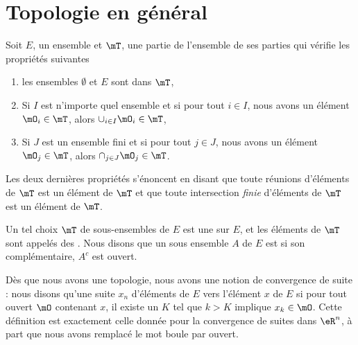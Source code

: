 
					\section{Topologie en général}

\begin{definition}		\label{DefTopologieGene}
Soit $E$, un ensemble et $\mT$, une partie de l'ensemble de ses parties qui vérifie les propriétés suivantes
\begin{enumerate}

\item
les ensembles $\emptyset$ et $E$ sont dans $\mT$,

\item
Si $I$ est n'importe quel ensemble et si pour tout $i\in I$, nous avons un élément $\mO_i\in\mT$, alors $\cup_{i\in I}\mO_i\in\mT$,

\item
Si $J$ est un ensemble fini et si pour tout $j\in J$, nous avons un élément $\mO_j\in\mT$, alors $\cap_{j\in J}\mO_j\in\mT$.

\end{enumerate}
Les deux dernières propriétés s'énoncent en disant que toute réunions d'éléments de $\mT$ est un élément de $\mT$ et que toute intersection \emph{finie} d'éléments de $\mT$ est un élément de $\mT$.

Un tel choix $\mT$ de sous-ensembles de $E$ est une   sur $E$, et les éléments de $\mT$ sont appelés des . Nous disons que un sous ensemble $A$ de $E$ est  si son complémentaire, $A^c$ est ouvert.
\end{definition}

Dès que nous avons une topologie, nous avons une notion de convergence de suite : nous disons qu'une suite $x_n$ d'éléments de $E$  vers l'élément $x$ de $E$ si pour tout ouvert $\mO$ contenant $x$, il existe un $K$ tel que $k>K$ implique $x_k\in\mO$. Cette définition est exactement celle donnée pour la convergence de suites dans $\eR^n$, à part que nous avons remplacé le mot \og boule\fg{} par \og ouvert\fg.

